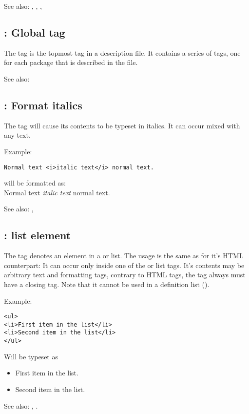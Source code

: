 See also: , , , 

\subsection{ : Global tag}
\label{tag:fpdocdescription}
The  tag is the topmost tag in a description file. It
contains a series of  tags, one for each package that is
described in the file.

See also: 

\subsection{ : Format italics}
\label{tag:i}
The  tag will cause its contents to be typeset in italics. It can
occur mixed with any text.

Example:
\begin{verbatim}
Normal text <i>italic text</i> normal text.
\end{verbatim}
will be formatted as:\\
Normal text \textit{italic text} normal text.

See also: , 

\subsection{ : list element}
\label{tag:li}
The tag  denotes an element in a  or  list.
The usage is the same as for it's HTML counterpart: It can occur 
only inside one of the   or  list tags.
It's contents may be arbitrary text and formatting tags, contrary to HTML
tags, the  tag always must have a closing tag. Note that it cannot be used in a
definition list ().

Example:
\begin{verbatim}
<ul>
<li>First item in the list</li>
<li>Second item in the list</li>
</ul>
\end{verbatim}
Will be typeset as
\begin{itemize}
\item First item in the list.
\item Second item in the list.
\end{itemize}

See also: , .

